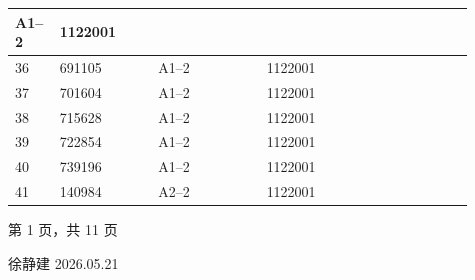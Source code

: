 \documentclass[UTF8,10pt,a4paper,fontset=fandol]{ctexart}
\newcommand{\fieldvalue}[1]{#1}
\newcommand{\handwritten}[1]{#1}
\begin{document}
\begin{tabular}{|p{0.07\linewidth}|p{0.20\linewidth}|p{0.22\linewidth}|p{0.24\linewidth}|p{0.18\linewidth}|}
\fieldvalue{A1--2} &
\fieldvalue{1122001} & \\
\hline
36 &
\fieldvalue{691105} &
\fieldvalue{A1--2} &
\fieldvalue{1122001} & \\
\hline
37 &
\fieldvalue{701604} &
\fieldvalue{A1--2} &
\fieldvalue{1122001} & \\
\hline
38 &
\fieldvalue{715628} &
\fieldvalue{A1--2} &
\fieldvalue{1122001} & \\
\hline
39 &
\fieldvalue{722854} &
\fieldvalue{A1--2} &
\fieldvalue{1122001} & \\
\hline
40 &
\fieldvalue{739196} &
\fieldvalue{A1--2} &
\fieldvalue{1122001} & \\
\hline
41 &
\fieldvalue{140984} &
\fieldvalue{A2--2} &
\fieldvalue{1122001} & \\
\hline
\end{tabular}

\normalsize
\vfill
\begin{center}
第 1 页，共 11 页
\end{center}

\handwritten{徐静建}\quad
\handwritten{2026.05.21}
\end{document}
